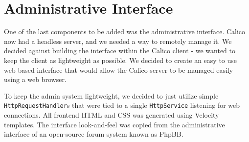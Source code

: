 \section{Administrative Interface}
One of the last components to be added was the administrative interface. Calico now had a headless server, and we needed a way to remotely manage it. We decided against building the interface within the Calico client - we wanted to keep the client as lightweight as possible. 
We decided to create an easy to use web-based interface that would allow the Calico server to be managed easily using a web browser.

To keep the admin system lightweight, we decided to just utilize simple \texttt{HttpRequestHandler}s that were tied to a single \texttt{HttpService} listening for web connections. All frontend HTML and CSS was generated using Velocity\cite{velocity} templates. The interface look-and-feel was copied from the administrative interface of an open-source forum system known as PhpBB\cite{todo}.

